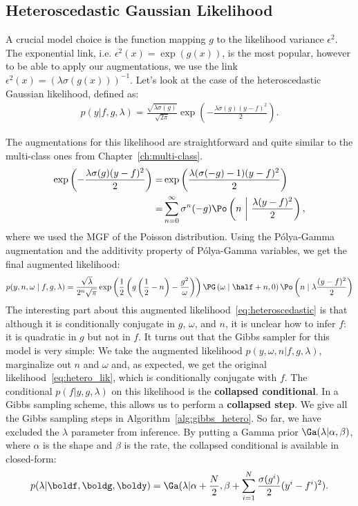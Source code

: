 \subsection{Heteroscedastic Gaussian Likelihood}
\label{sec:hetero_gaussian}
A crucial model choice is the function mapping $g$ to the likelihood variance $\epsilon^2$.
The exponential link, i.e. $\epsilon^2(x) = \exp(g(x))$, is the most popular, however to be able to apply our augmentations, we use the link $\epsilon^2(x) = \left(\lambda \sigma(g(x))\right)^{-1}$.
Let's look at the case of the heteroscedastic Gaussian likelihood, defined as:
\begin{align}
    p(y|f,g,\lambda) = \frac{\sqrt{\lambda \sigma(g)}}{\sqrt{2\pi}}\exp\left(-\frac{\lambda \sigma(g)(y-f)^2}{2}\right).\label{eq:hetero_lik}
\end{align}

The augmentations for this likelihood are straightforward and quite similar to the multi-class ones from Chapter~\ref{ch:multi-class}.
\begin{align}
    \exp\left(-\frac{\lambda\sigma(g)(y-f)^2}{2}\right) =& \exp\left(\frac{\lambda(\sigma(-g) -1)(y-f)^2}{2}\right)\nonumber\\
    =&\sum_{n=0}^\infty \sigma^n(-g)\Po \left(n~\middle|~\frac{\lambda(y-f)^2}{2}\right),\label{eq:aug_poisson}
\end{align}
where we used the \ac{MGF} of the Poisson distribution.
Using the P\'olya-Gamma augmentation and the additivity property of P\'olya-Gamma variables, we get the final augmented likelihood:
\begin{align}
    p(y,n,\omega\mid f,g,\lambda) = \frac{\sqrt{\lambda}}{2^n\sqrt{\pi}}\exp\left(\frac{1}{2}\left(g\left(\frac{1}{2}-n\right) - \frac{g^2}{\omega}\right)\right)\PG \left(\omega \mid \half + n, 0\right) \Po \left(n \mid \lambda\frac{(y-f)^2}{2}\right)\label{eq:heteroscedastic}
\end{align}
The interesting part about this augmented likelihood~\eqref{eq:heteroscedastic} is that although it is conditionally conjugate in $g$, $\omega$, and $n$, it is unclear how to infer $f$:
it is quadratic in $g$ but not in $f$.
It turns out that the Gibbs sampler for this model is very simple:
We take the augmented likelihood $p(y,\omega,n|f,g,\lambda)$, marginalize out $n$ and $\omega$ and, as expected, we get the original likelihood~\eqref{eq:hetero_lik}, which is conditionally conjugate with $f$.
The conditional $p(f|y,g,\lambda)$ on this likelihood is the \textbf{collapsed conditional}.
In a Gibbs sampling scheme, this allows us to perform a \textbf{collapsed step}.
We give all the Gibbs sampling steps in Algorithm~\ref{alg:gibbs_hetero}.
So far, we have excluded the $\lambda$ parameter from inference.
By putting a Gamma prior $\Ga(\lambda|\alpha, \beta)$, where $\alpha$ is the shape and $\beta$ is the rate, the collapsed conditional is available in closed-form:
\begin{align*}
    p(\lambda|\boldf, \boldg, \boldy) = \Ga(\lambda| \alpha + \frac{N}{2}, \beta + \sum_{i=1}^N \frac{\sigma(g^i)}{2}(y^i - f^i)^2).
\end{align*}


